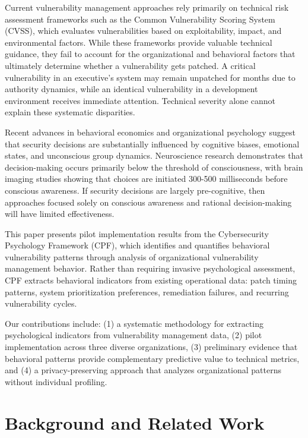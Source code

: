 \documentclass[10pt, twocolumn]{article}
\begin{document}
Current vulnerability management approaches rely primarily on technical risk assessment frameworks such as the Common Vulnerability Scoring System (CVSS), which evaluates vulnerabilities based on exploitability, impact, and environmental factors. While these frameworks provide valuable technical guidance, they fail to account for the organizational and behavioral factors that ultimately determine whether a vulnerability gets patched. A critical vulnerability in an executive's system may remain unpatched for months due to authority dynamics, while an identical vulnerability in a development environment receives immediate attention. Technical severity alone cannot explain these systematic disparities.

Recent advances in behavioral economics and organizational psychology suggest that security decisions are substantially influenced by cognitive biases, emotional states, and unconscious group dynamics\cite{kahneman2011}. Neuroscience research demonstrates that decision-making occurs primarily below the threshold of consciousness, with brain imaging studies showing that choices are initiated 300-500 milliseconds before conscious awareness\cite{libet1983, soon2008}. If security decisions are largely pre-cognitive, then approaches focused solely on conscious awareness and rational decision-making will have limited effectiveness.

This paper presents pilot implementation results from the Cybersecurity Psychology Framework (CPF), which identifies and quantifies behavioral vulnerability patterns through analysis of organizational vulnerability management behavior. Rather than requiring invasive psychological assessment, CPF extracts behavioral indicators from existing operational data: patch timing patterns, system prioritization preferences, remediation failures, and recurring vulnerability cycles.

Our contributions include: (1) a systematic methodology for extracting psychological indicators from vulnerability management data, (2) pilot implementation across three diverse organizations, (3) preliminary evidence that behavioral patterns provide complementary predictive value to technical metrics, and (4) a privacy-preserving approach that analyzes organizational patterns without individual profiling.

\section{Background and Related Work}
\end{document}
